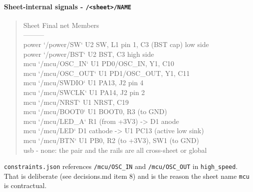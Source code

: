\documentclass[11pt,a4paper]{article}
\begin{document}
\paragraph*{Sheet-internal signals - \texttt{/\textless{}sheet\textgreater{}/NAME}}
\begin{quote}\small\ttfamily\raggedright
\textbar{} Sheet \textbar{} Final net \textbar{} Members \textbar{}\\
\textbar{}---\textbar{}---\textbar{}---\textbar{}\\
\textbar{} power \textbar{} `/power/SW` \textbar{} U2 SW, L1 pin 1, C3 (BST cap) low side \textbar{}\\
\textbar{} power \textbar{} `/power/BST` \textbar{} U2 BST, C3 high side \textbar{}\\
\textbar{} mcu \textbar{} `/mcu/OSC\_IN` \textbar{} U1 PD0/OSC\_IN, Y1, C10 \textbar{}\\
\textbar{} mcu \textbar{} `/mcu/OSC\_OUT` \textbar{} U1 PD1/OSC\_OUT, Y1, C11 \textbar{}\\
\textbar{} mcu \textbar{} `/mcu/SWDIO` \textbar{} U1 PA13, J2 pin 4 \textbar{}\\
\textbar{} mcu \textbar{} `/mcu/SWCLK` \textbar{} U1 PA14, J2 pin 2 \textbar{}\\
\textbar{} mcu \textbar{} `/mcu/NRST` \textbar{} U1 NRST, C19 \textbar{}\\
\textbar{} mcu \textbar{} `/mcu/BOOT0` \textbar{} U1 BOOT0, R3 (to GND) \textbar{}\\
\textbar{} mcu \textbar{} `/mcu/LED\_A` \textbar{} R1 (from +3V3) -\textgreater{} D1 anode \textbar{}\\
\textbar{} mcu \textbar{} `/mcu/LED` \textbar{} D1 cathode -\textgreater{} U1 PC13 (active low sink) \textbar{}\\
\textbar{} mcu \textbar{} `/mcu/BTN` \textbar{} U1 PB0, R2 (to +3V3), SW1 (to GND) \textbar{}\\
\textbar{} usb \textbar{} - \textbar{} none: the pair and the rails are all cross-sheet or global \textbar{}
\end{quote}
\texttt{constraints.json} references \texttt{/mcu/OSC\_IN} and \texttt{/mcu/OSC\_OUT} in \texttt{high\_speed}. That is deliberate (see decisions.md item 8) and is the reason the sheet name \texttt{mcu} is contractual.
\end{document}
